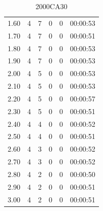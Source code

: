 \documentclass[review]{elsarticle}
\begin{document}
\begin{table}[H]
\begin{subtable}[h]{0.45\textwidth}
{\begin{tabular}{@{}cccccc@{}}
                 1.60 & 4 & 7 & 0 & 0 & 00:00:53 \\
                 1.70 & 4 & 7 & 0 & 0 & 00:00:51 \\
                 1.80 & 4 & 7 & 0 & 0 & 00:00:53 \\
                 1.90 & 4 & 7 & 0 & 0 & 00:00:53 \\
                 2.00 & 4 & 5 & 0 & 0 & 00:00:53 \\
                 2.10 & 4 & 5 & 0 & 0 & 00:00:53 \\
                 2.20 & 4 & 5 & 0 & 0 & 00:00:57 \\
                 2.30 & 4 & 5 & 0 & 0 & 00:00:51 \\
                 2.40 & 4 & 4 & 0 & 0 & 00:00:52 \\
                 2.50 & 4 & 4 & 0 & 0 & 00:00:51 \\
                 2.60 & 4 & 3 & 0 & 0 & 00:00:52 \\
                 2.70 & 4 & 3 & 0 & 0 & 00:00:52 \\
                 2.80 & 4 & 2 & 0 & 0 & 00:00:50 \\
                 2.90 & 4 & 2 & 0 & 0 & 00:00:51 \\
                 3.00 & 4 & 2 & 0 & 0 & 00:00:51 \\
        \end{tabular}
        }
        \caption{2000CA30}
        \label{tab:2000CA30_travelmin}
    \end{subtable}
    \hfill
    \begin{subtable}[h]{0.45\textwidth}
        \centering
\end{subtable}
\end{table}
\end{document}
